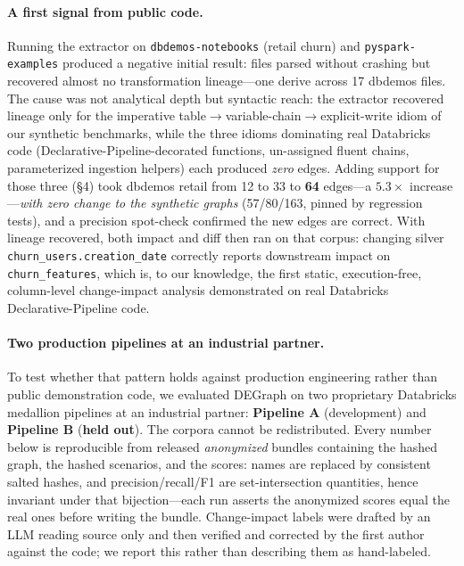 \documentclass[11pt]{article}
\newcommand{\code}[1]{\texttt{#1}}
\begin{document}
\paragraph{A first signal from public code.} Running the extractor on
\code{dbdemos-notebooks} (retail churn) and \code{pyspark-examples} produced a
negative initial result: files parsed without crashing but recovered almost no
transformation lineage---one derive across 17 dbdemos files. The cause was not
analytical depth but syntactic reach: the extractor recovered lineage only for the
imperative table$\rightarrow$variable-chain$\rightarrow$explicit-write idiom of our
synthetic benchmarks, while the three idioms dominating real Databricks code
(Declarative-Pipeline-decorated functions, un-assigned fluent chains, parameterized
ingestion helpers) each produced \emph{zero} edges. Adding support for those three
(\S4) took dbdemos retail from 12 to 33 to \textbf{64} edges---a $5.3\times$
increase---\emph{with zero change to the synthetic graphs} (57/80/163, pinned by
regression tests), and a precision spot-check confirmed the new edges are correct.
With lineage recovered, both impact and diff then ran on that corpus: changing
silver \code{churn_users.\allowbreak creation_date} correctly reports downstream impact on
\code{churn_features}, which is, to our knowledge, the first static, execution-free,
column-level change-impact analysis demonstrated on real Databricks
Declarative-Pipeline code.

\paragraph{Two production pipelines at an industrial partner.} To test whether that pattern holds
against production engineering rather than public demonstration code, we evaluated
DEGraph on two proprietary Databricks medallion pipelines at an industrial partner:
\textbf{Pipeline A} (development) and \textbf{Pipeline B} (\textbf{held
out}). The corpora cannot be redistributed. Every number below is reproducible from
released \emph{anonymized} bundles containing the hashed graph, the hashed
scenarios, and the scores: names are replaced by consistent salted hashes, and
precision/recall/F1 are set-intersection quantities, hence invariant under that
bijection---each run asserts the anonymized scores equal the real ones before
writing the bundle. Change-impact labels were drafted by an LLM reading source only
and then verified and corrected by the first author against the code; we report this
rather than describing them as hand-labeled.
\end{document}
